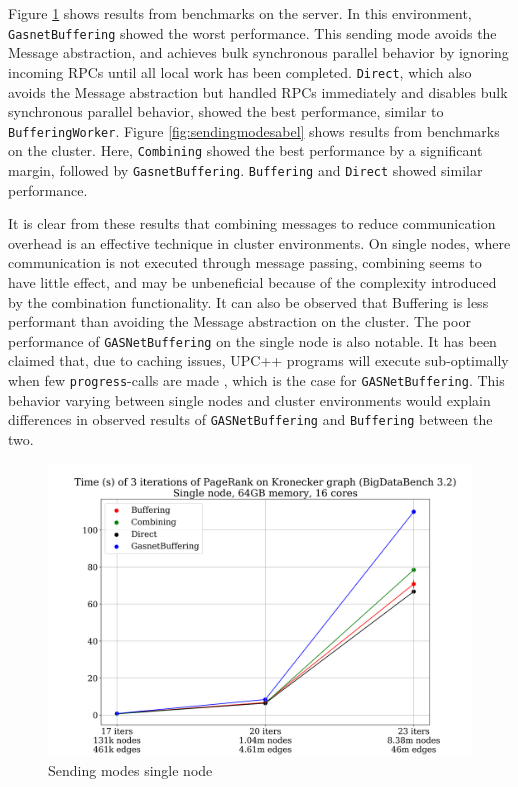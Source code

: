 \documentclass{uit-report}
\begin{document}
Figure \ref{fig:sendingmodes} shows results from benchmarks on the server. In this environment, \\\texttt{GasnetBuffering} showed the worst performance. This sending mode avoids the Message abstraction, and achieves bulk synchronous parallel behavior by ignoring incoming RPCs until all local work has been completed. \texttt{Direct}, which also avoids the Message abstraction but handled RPCs immediately and disables bulk synchronous parallel behavior, showed the best performance, similar to \texttt{BufferingWorker}. Figure \ref{fig:sendingmodesabel} shows results from benchmarks on the cluster. Here, \texttt{Combining} showed the best performance by a significant margin, followed by \texttt{GasnetBuffering}. \texttt{Buffering} and \texttt{Direct} showed similar performance.

It is clear from these results that combining messages to reduce communication overhead is an effective technique in cluster environments. On single nodes, where communication is not executed through message passing, combining seems to have little effect, and may be unbeneficial because of the complexity introduced by the combination functionality.
It can also be observed that Buffering is less performant than avoiding the Message abstraction on the cluster. The poor performance of \texttt{GASNetBuffering} on the single node is also notable. It has been claimed that, due to caching issues, UPC++ programs will execute sub-optimally when few \texttt{progress}-calls are made \cite{gasneteventissues}, which is the case for \texttt{GASNetBuffering}. This behavior varying between single nodes and cluster environments would explain differences in observed results of \texttt{GASNetBuffering} and \texttt{Buffering} between the two.



\newpage
\begin{figure}[H]
	\centering
	\includegraphics[width=15cm]{illustrations/png/sendingmodessinglenode.png}
	\caption{Sending modes single node}
	\label{fig:sendingmodes}
\end{figure}
\end{document}
